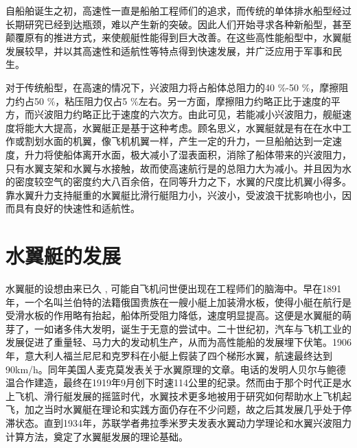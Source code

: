 \documentclass[10.5pt,twocolumn]{jbuaa}
\begin{document}
\wuhao 


自船舶诞生之初，高速性一直是船舶工程师们的追求，而传统的单体排水船型经过长期研究已经到达瓶颈，难以产生新的突破。因此人们开始寻求各种新船型，甚至颠覆原有的推进方式，来使舰艇性能得到巨大改善。在这些高性能船型中，水翼艇发展较早，并以其高速性和适航性等特点得到快速发展，并广泛应用于军事和民生。

对于传统船型，在高速的情况下，兴波阻力将占船体总阻力的40 \%-50 \%，摩擦阻力约占50 \%，粘压阻力仅占5 \%左右。另一方面，摩擦阻力约略正比于速度的平方，而兴波阻力约略正比于速度的六次方。由此可见，若能减小兴波阻力，舰艇速度将能大大提高，水翼艇正是基于这种考虑。顾名思义，水翼艇就是有在在水中工作或割划水面的机翼，像飞机机翼一样，产生一定的升力，一旦船舶达到一定速度，升力将使船体离开水面，极大减小了湿表面积，消除了船体带来的兴波阻力，只有水翼支架和水翼与水接触，故而使高速航行是的总阻力大为减小。\enlargethispage{-3.3cm}并且因为水的密度较空气的密度约大八百余倍，在同等升力之下，水翼的尺度比机翼小得多。靠水翼升力支持艇重的水翼艇比滑行艇阻力小，兴波小，受波浪干扰影响也小，因而具有良好的快速性和适航性。\enlargethispage{-3.3cm}


\section{水翼艇的发展}
水翼艇的设想由来已久 , 可能自飞机问世便出现在工程师们的脑海中。早在1891年，一个名叫兰伯特的法籍俄国贵族在一艘小艇上加装滑水板，使得小艇在航行是受滑水板的作用略有抬起，船体所受阻力降低，速度明显提高。这便是水翼艇的萌芽了，一如诸多伟大发明，诞生于无意的尝试中。二十世纪初，汽车与飞机工业的发展促进了重量轻、马力大的发动机生产，从而为高性能船的发展埋下伏笔。1906年，意大利人福兰尼尼和克罗科在小艇上假装了四个梯形水翼，航速最终达到90km/h。同年美国人麦克莫发表关于水翼原理的文章。电话的发明人贝尔与鲍德温合作建造，最终在1919年9月创下时速114公里的纪录。然而由于那个时代正是水上飞机、滑行艇发展的摇篮时代，水翼技术更多地被用于研究如何帮助水上飞机起飞，加之当时水翼艇在理论和实践方面仍存在不少问题，故之后其发展几乎处于停滞状态。直到1934年，苏联学者弗拉季米罗夫发表水翼动力学理论和水翼兴波阻力计算方法，奠定了水翼艇发展的理论基础。
\end{document}
